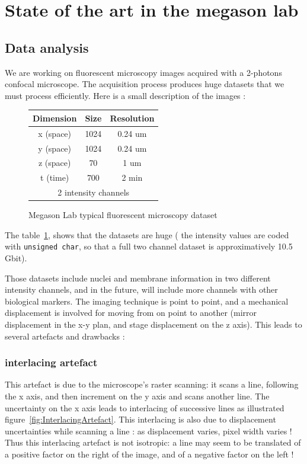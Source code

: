 %
%

\section{State of the art in the megason lab}


\subsection{Data analysis}

We are working on fluorescent microscopy images acquired with a 2-photons confocal microscope. The acquisition process produces huge datasets that we must process efficiently.
Here is a small description of the images :
\begin{figure}[htb]
\begin{center}
\begin{tabular}{|c|c|c|}
\hline Dimension & Size & Resolution \\ 
\hline x (space) & 1024 & 0.24 um \\ 
\hline y (space) & 1024 & 0.24 um \\ 
\hline z (space) & 70 & 1 um \\ 
\hline t (time) & 700 & 2 min\\ 
\hline \multicolumn{3}{|c|}{ 2 intensity channels} \\ 
\hline
\end{tabular} 
\end{center}
\caption{Megason Lab typical fluorescent microscopy dataset}
\label{tab:DataSizes}
\end{figure}
The table~\ref{tab:DataSizes}, shows that the datasets are huge ( the intensity values are coded with {\verb+unsigned char+}, so that a full two channel dataset is approximatively  10.5 Gbit).

Those datasets include nuclei and membrane information in two different intensity channels, and in the future, will include more channels with other biological markers. The imaging technique is point to point, and a mechanical displacement is involved for moving from on point to another (mirror displacement in the x-y plan, and stage displacement on the z axis). This leads to several artefacts and drawbacks :

\subsubsection{interlacing artefact}
This artefact is due to the microscope's raster scanning: it scans a line, following the x axis, and then increment on the y axis and scans another line.
The uncertainty on the x axis leads to interlacing of successive lines as illustrated figure~\ref{fig:InterlacingArtefact}.
This interlacing is also due to displacement uncertainties while scanning a line : as displacement varies, pixel width varies !
Thus this interlacing artefact is not isotropic: a line may seem to be translated of a positive factor on the right of the image, and of a negative factor on the left !

